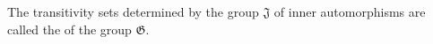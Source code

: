 The transitivity sets determined by the group $\mathfrak{J}$ of inner automorphisms are called the  of the group $\mathfrak{G}$.
